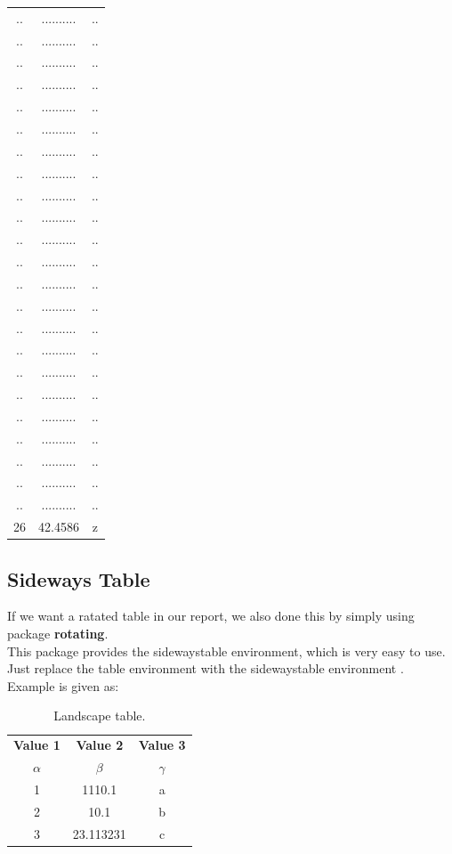 \documentclass{article}
\begin{document}
\begin{longtable}{c|c|c}
  ..& ..........&..\\
  ..& ..........&..\\
  ..& ..........&..\\
  ..& ..........&..\\
  ..& ..........&..\\
  ..& ..........&..\\
  ..& ..........&..\\
  ..& ..........&..\\
  ..& ..........&..\\
  ..& ..........&..\\
  ..& ..........&..\\
  ..& ..........&..\\
  ..& ..........&..\\
  ..& ..........&..\\
  ..& ..........&..\\
  ..& ..........&..\\
  ..& ..........&..\\
  ..& ..........&..\\
  ..& ..........&..\\
  ..& ..........&..\\
  ..& ..........&..\\
  ..& ..........&..\\
  ..& ..........&..\\
  26& 42.4586   &z\\
  
  \bottomrule
\end{longtable}

\subsection{Sideways Table}
If we want a ratated table in our report, we also done this by simply using package \textbf{rotating}.\\
This package provides the sidewaystable environment, which is very easy to use. Just replace the table environment with the sidewaystable environment .\\
Example is given as:

\begin{table}
  \begin{center}
  \caption{Landscape table.}
  \label{tab:table1}
  \begin{tabular}{c|c|c}
  	\toprule
  	\textbf{Value 1} & \textbf{Value 2} & \textbf{Value 3}\\
  	$\alpha$ & $\beta$ & $\gamma$ \\
    \midrule
    1 & 1110.1 & a\\
    2 & 10.1 & b\\
    3 & 23.113231 & c\\
    \bottomrule
  \end{tabular}
  \end{center}
\end{table}
\end{document}
